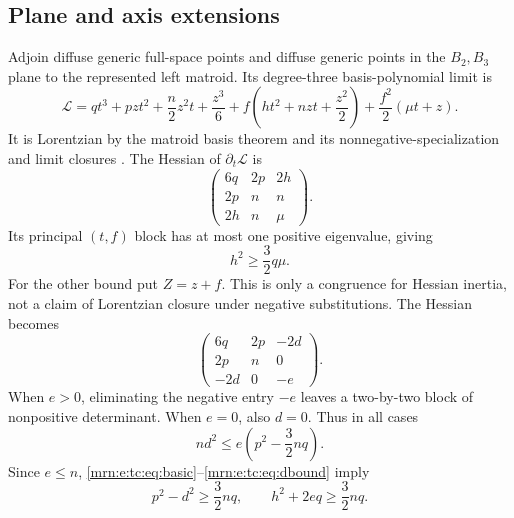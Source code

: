 \documentclass[11pt,a4paper]{article}
\theoremstyle{remark}\newtheorem{remark}[theorem]{Remark}
\begin{document}
\subsection{Plane and axis extensions}
Adjoin diffuse generic full-space points and diffuse generic points in the $B_2,B_3$ plane to the represented left matroid. Its degree-three basis-polynomial limit is
\begin{equation}\label{mrn:e:tc:eq:left}
 \mathcal L=q t^3+pzt^2+\frac n2z^2t+\frac{z^3}{6}
 +f\left(ht^2+nzt+\frac{z^2}{2}\right)
 +\frac{f^2}{2}(\mu t+z).
\end{equation}
It is Lorentzian by the matroid basis theorem and its nonnegative-specialization and limit closures \cite{b:BH}. The Hessian of $\partial_t\mathcal L$ is
\[
 \begin{pmatrix}6q&2p&2h\\2p&n&n\\2h&n&\mu\end{pmatrix}.
\]
Its principal $(t,f)$ block has at most one positive eigenvalue, giving
\begin{equation}\label{mrn:e:tc:eq:hbound}
 h^2\ge\frac32q\mu.
\end{equation}
For the other bound put $Z=z+f$. This is only a congruence for Hessian inertia, not a claim of Lorentzian closure under negative substitutions. The Hessian becomes
\[
 \begin{pmatrix}6q&2p&-2d\\2p&n&0\\-2d&0&-e\end{pmatrix}.
\]
When $e>0$, eliminating the negative entry $-e$ leaves a two-by-two block of nonpositive determinant. When $e=0$, also $d=0$. Thus in all cases
\begin{equation}\label{mrn:e:tc:eq:dbound}
 nd^2\le e\left(p^2-\frac32nq\right).
\end{equation}
Since $e\le n$, \eqref{mrn:e:tc:eq:basic}--\eqref{mrn:e:tc:eq:dbound} imply
\begin{equation}\label{mrn:e:tc:eq:mixture}
 p^2-d^2\ge\frac32nq,\qquad h^2+2eq\ge\frac32nq.
\end{equation}
\end{document}
